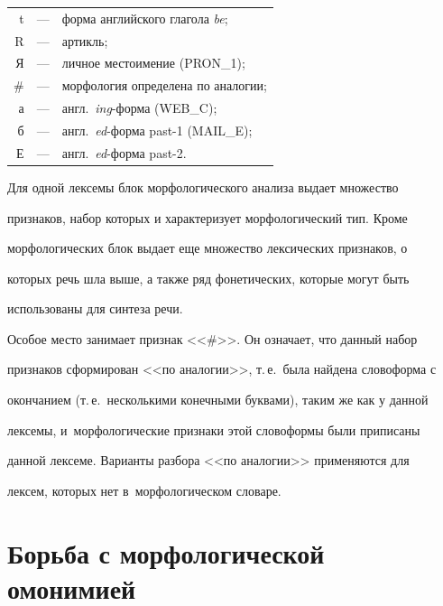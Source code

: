 \noindent

    \begin{tabular}{rcl}

        t&---& форма английского глагола \textit{be};\\

    R&---& артикль;\\

    Я&---& личное местоимение (PRON\_1);\\

    \#&---& морфология определена по аналогии;\\

    а&---& англ.\ \textit{ing}-форма (WEB\_C);\\

    б&---& англ.\ \textit{ed}-форма past-1 (MAIL\_E);\\

    Е&---& англ.\ \textit{ed}-форма past-2.

\end{tabular}



\smallskip





    Для одной лексемы блок морфологического анализа выдает множество

признаков, набор которых и характеризует морфологический тип. Кроме

морфологических блок выдает еще множество лексических признаков, о

которых речь шла выше, а также ряд фонетических, которые могут быть

использованы для синтеза речи.



    Особое место занимает признак <<\#>>. Он означает, что данный набор

признаков сформирован <<по аналогии>>, т.\,е.\ была найдена словоформа с

окончанием (т.\,е.\ несколькими конечными буквами), таким же как у данной

лексемы, и~морфологические признаки этой словоформы были приписаны

данной лексеме. Варианты разбора <<по аналогии>> применяются для

лексем, которых нет в~морфологическом словаре.



\section{Борьба с морфологической омонимией}



